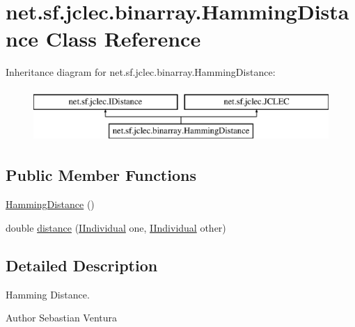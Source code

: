 \hypertarget{classnet_1_1sf_1_1jclec_1_1binarray_1_1_hamming_distance}{\section{net.\-sf.\-jclec.\-binarray.\-Hamming\-Distance Class Reference}
\label{classnet_1_1sf_1_1jclec_1_1binarray_1_1_hamming_distance}
}
Inheritance diagram for net.\-sf.\-jclec.\-binarray.\-Hamming\-Distance\-:\begin{figure}[H]
\begin{center}
\leavevmode
\includegraphics[height=2.000000cm]{classnet_1_1sf_1_1jclec_1_1binarray_1_1_hamming_distance}
\end{center}
\end{figure}
\subsection*{Public Member Functions}
\begin{DoxyCompactItemize}
\item 
\hyperlink{classnet_1_1sf_1_1jclec_1_1binarray_1_1_hamming_distance_a5464682a37640f6dde0e2d60c4ed3953}{Hamming\-Distance} ()
\item 
double \hyperlink{classnet_1_1sf_1_1jclec_1_1binarray_1_1_hamming_distance_aa6048ae645bff1a5b03ee2925dc8d0e2}{distance} (\hyperlink{interfacenet_1_1sf_1_1jclec_1_1_i_individual}{I\-Individual} one, \hyperlink{interfacenet_1_1sf_1_1jclec_1_1_i_individual}{I\-Individual} other)
\end{DoxyCompactItemize}


\subsection{Detailed Description}
Hamming Distance.

\begin{DoxyAuthor}{Author}
Sebastian Ventura 
\end{DoxyAuthor}


